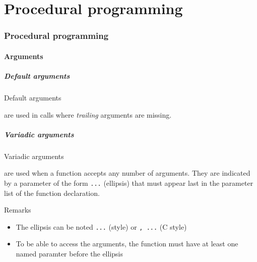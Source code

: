 \part{Procedural programming}
\label{part:proc}

\section{Procedural programming}


\subsection{Arguments}

\subsubsection{Default arguments}

\begin{frame}{Default arguments}{}
  \begin{definition}
     are used in calls where \emph{trailing} arguments are missing.
  \end{definition}

  \begin{example}
  \end{example}
\end{frame}

\subsubsection{Variadic arguments}

\begin{frame}{Variadic arguments}{}
  \begin{definition}
     are used when a function accepts any number of arguments. They are indicated by a parameter of the form \lstinline!...! (ellipsis) that must appear last in the parameter list of the function declaration.
  \end{definition}

  \begin{block}{Remarks}
    \begin{itemize}
    \item
      The ellipsis can be noted \lstinline!...! (\CCLang style) or \lstinline!, ...! (C style)
      \smallskip
    \item
      To be able to access the arguments, the function must have at least one named paramter before the ellipsis
    \end{itemize}
  \end{block}
\end{frame}

